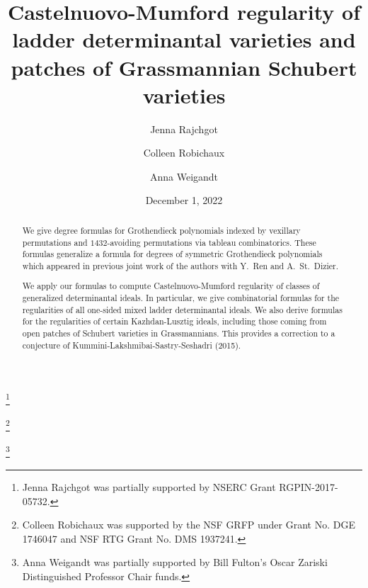 \documentclass[12pt]{amsart}
\theoremstyle{definition}
\theoremstyle{remark}
\numberwithin{equation}{section}
\begin{document}
\title[Regularity of ladder determinantal ideals]{ Castelnuovo-Mumford regularity of\\ ladder determinantal varieties and \\patches of Grassmannian Schubert varieties}


\author{Jenna Rajchgot }
\address[JR]{
Dept.~of Mathematics and Statistics, 
McMaster University, 
Hamilton, ON  \newline \indent  L8S 4K1, CANADA}
\thanks{Jenna Rajchgot was partially supported by NSERC Grant RGPIN-2017-05732.}



\author{Colleen Robichaux}
\address[CR]{
Dept.~of Mathematics,
University of California, Los Angeles
Los Angeles, CA \newline {}, USA}
\thanks{Colleen Robichaux was supported by the NSF GRFP under Grant No. DGE 1746047 and NSF RTG Grant No. DMS 1937241.}




\author{Anna Weigandt}
\address[AW]{Dept.~of Mathematics, Massachusetts Institute of Technology, Cambridge, MA 02142, USA}
\thanks{Anna Weigandt was partially supported by Bill Fulton's Oscar Zariski Distinguished Professor Chair funds.}

\date{December 1, 2022}


\begin{abstract}
 We give degree formulas for Grothendieck polynomials indexed by vexillary permutations and $1432$-avoiding permutations via tableau combinatorics.  These formulas generalize a formula  for degrees of symmetric Grothendieck polynomials which appeared in previous  joint work of the authors with Y.~Ren and A.~St.~Dizier.
 
 We apply our formulas to compute Castelnuovo-Mumford regularity of classes of generalized determinantal ideals. In particular, we give combinatorial formulas for the regularities of all one-sided mixed ladder determinantal ideals. 
We also derive formulas for the regularities of certain Kazhdan-Lusztig ideals, including those coming from open patches of Schubert varieties in Grassmannians. This provides a correction to a conjecture of Kummini-Lakshmibai-Sastry-Seshadri (2015).  
\end{abstract}

\maketitle
\end{document}

